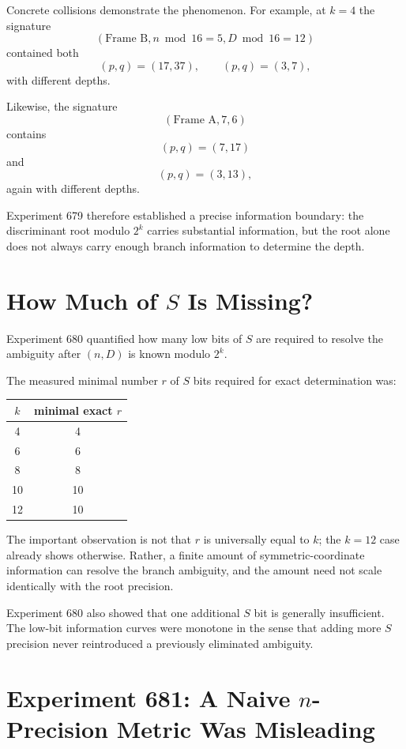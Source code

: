 \documentclass[11pt,a4paper]{article}
\begin{document}
Concrete collisions demonstrate the phenomenon.  For example, at $k=4$ the signature
\[
(\text{Frame B},n\bmod16=5,D\bmod16=12)
\]
contained both
\[
(p,q)=(17,37),
\qquad
(p,q)=(3,7),
\]
with different depths.

Likewise, the signature
\[
(\text{Frame A},7,6)
\]
contains
\[
(p,q)=(7,17)
\]
and
\[
(p,q)=(3,13),
\]
again with different depths.

Experiment 679 therefore established a precise information boundary: the discriminant root modulo $2^k$ carries substantial information, but the root alone does not always carry enough branch information to determine the depth.

\section{How Much of $S$ Is Missing?}

Experiment 680 quantified how many low bits of $S$ are required to resolve the ambiguity after $(n,D)$ is known modulo $2^k$.

The measured minimal number $r$ of $S$ bits required for exact determination was:
\begin{center}
\begin{tabular}{c c}
\toprule
$k$ & minimal exact $r$ \\
\midrule
4  & 4 \\
6  & 6 \\
8  & 8 \\
10 & 10 \\
12 & 10 \\
\bottomrule
\end{tabular}
\end{center}

The important observation is not that $r$ is universally equal to $k$; the $k=12$ case already shows otherwise.  Rather, a finite amount of symmetric-coordinate information can resolve the branch ambiguity, and the amount need not scale identically with the root precision.

Experiment 680 also showed that one additional $S$ bit is generally insufficient.  The low-bit information curves were monotone in the sense that adding more $S$ precision never reintroduced a previously eliminated ambiguity.

\section{Experiment 681: A Naive $n$-Precision Metric Was Misleading}
\end{document}
